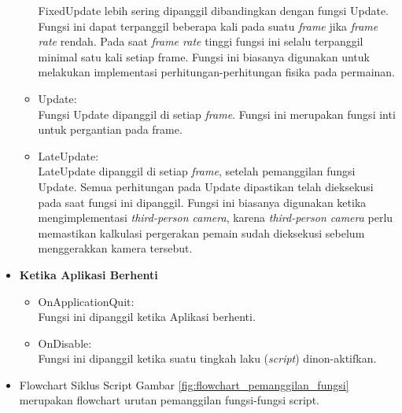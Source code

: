 \begin{itemize}
\begin{itemize}
        FixedUpdate lebih sering dipanggil dibandingkan dengan fungsi Update. Fungsi ini dapat terpanggil beberapa kali pada suatu \textit{frame} jika \textit{frame rate} rendah. Pada saat \textit{frame rate} tinggi fungsi ini selalu terpanggil minimal satu kali setiap frame. Fungsi ini biasanya digunakan untuk melakukan implementasi perhitungan-perhitungan fisika pada permainan. 
        \item Update:\\
        Fungsi Update dipanggil di setiap \textit{frame}. Fungsi ini merupakan fungsi inti untuk pergantian pada frame.
        \item LateUpdate:\\
        LateUpdate dipanggil di setiap \textit{frame}, setelah pemanggilan fungsi Update. Semua perhitungan pada Update dipastikan telah dieksekusi pada saat fungsi ini dipanggil. Fungsi ini biasanya digunakan ketika mengimplementasi \textit{third-person camera}, karena \textit{third-person camera} perlu memastikan kalkulasi pergerakan pemain sudah dieksekusi sebelum menggerakkan kamera tersebut.
    \end{itemize}
    \item \textbf{Ketika Aplikasi Berhenti}
    \begin{itemize}
        \item OnApplicationQuit:\\
        Fungsi ini dipanggil ketika Aplikasi berhenti.
        \item OnDisable:\\
        Fungsi ini dipanggil ketika suatu tingkah laku (\textit{script}) dinon-aktifkan.
    \end{itemize}
    \item Flowchart Siklus Script
    Gambar \ref{fig:flowchart_pemanggilan_fungsi} merupakan flowchart urutan pemanggilan fungsi-fungsi script.
    

\end{itemize}
